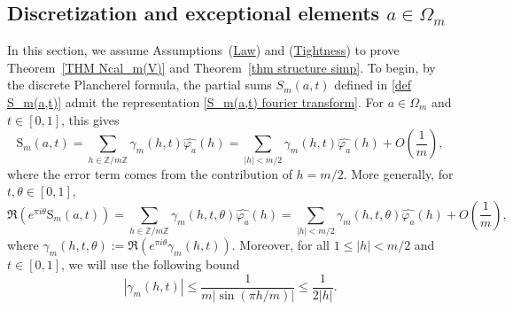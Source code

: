 \documentclass[12pt]{amsart}
\theoremstyle{definition}
\numberwithin{equation}{section}
\numberwithin{equation}{section}
\def\B{\mathrm{S}}
\begin{document}
\subsection{Discretization and exceptional elements $a\in \Omega_m$}

In this section, we assume Assumptions~(\hyperlink{Ass Law}{Law}) and (\hyperlink{Ass Tightness}{Tightness}) to prove Theorem~\ref{THM Ncal_m(V)} and Theorem~\ref{thm structure simp}. To begin, by the discrete Plancherel formula, the partial sums $S_m(a,t)$ defined in \eqref{def S_m(a,t)} admit the representation \eqref{S_m(a,t) fourier transform}. For $a\in\Omega_m$ and $t\in[0,1]$, this gives
\begin{equation}\label{eq term pair h=m/2}
\B_m(a,t)= \sum_{h\in \mathbb{Z}/m\mathbb{Z}}
\gamma_m(h,t)\widehat{\varphi_a}(h)
= \sum_{|h|< m/2} 
\gamma_m(h,t)\widehat{\varphi_a}(h) + O\!\left( \frac{1}{m} \right),
\end{equation}
where the error term comes from the contribution of \(h=m/2\). More generally, for \(t,\theta \in [0,1]\), 
\begin{equation}\label{eq term pair h=m/2 avec theta}
\Re\!\left(e^{\pi i\theta}\B_m(a,t)\right)
= \sum_{h\in \mathbb{Z}/m\mathbb{Z}}
\gamma_m(h,t,\theta)\widehat{\varphi_a}(h)
= \sum_{|h|< m/2} 
\gamma_m(h,t,\theta)\widehat{\varphi_a}(h) + O\!\left( \frac{1}{m} \right),
\end{equation}
where \(\gamma_m(h,t,\theta):= \Re\!\left(e^{\pi i\theta}\gamma_m(h,t)\right)\).
Moreover, for all \(1\leq |h|< m/2\) and \(t\in[0,1]\), we will use the following bound
\begin{equation}\label{Bound gamma p}
|\gamma_m(h,t)| \leq \frac{1}{m|\sin(\pi h/m)|}\leq \frac{1}{2|h|}.
\end{equation}
\end{document}
